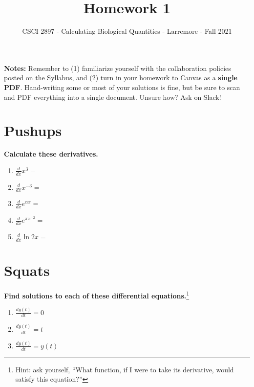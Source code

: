 \documentclass[11pt,onecolumn,superscriptaddress,notitlepage]{article}
\date{}
\newcommand{\dx}[0]{\displaystyle\frac{d}{dx}}
\begin{document}
\author{CSCI 2897 - Calculating Biological Quantities - Larremore - Fall 2021}
\title{Homework 1}
\maketitle

{\bf Notes:} Remember to (1) familiarize yourself with the collaboration policies posted on the Syllabus, and (2) turn in your homework to Canvas as a {\bf single PDF}. Hand-writing some or most of your solutions is fine, but be sure to scan and PDF everything into a single document. Unsure how? Ask on Slack! 

\section*{Pushups}

{\bf Calculate these derivatives.}

\begin{enumerate}
	\item $\dx x^3 = $
	\item $\dx x^{-3} = $
	\item $\dx e^{\alpha x} = $
	\item $\dx e^{\pi x^{-2}} = $
	\item $\dx \ln{2x} = $
\end{enumerate}

\section*{Squats}

{\bf Find solutions to each of these differential equations.}\footnote{Hint: ask yourself, ``What function, if I were to take its derivative, would satisfy this equation?''}

\begin{enumerate}[resume]
	\item $\displaystyle\frac{dy(t)}{dt} = 0$
	\item $\displaystyle\frac{dy(t)}{dt} = t$
	\item $\displaystyle\frac{dy(t)}{dt} = y(t)$
\end{enumerate}
\end{document}
